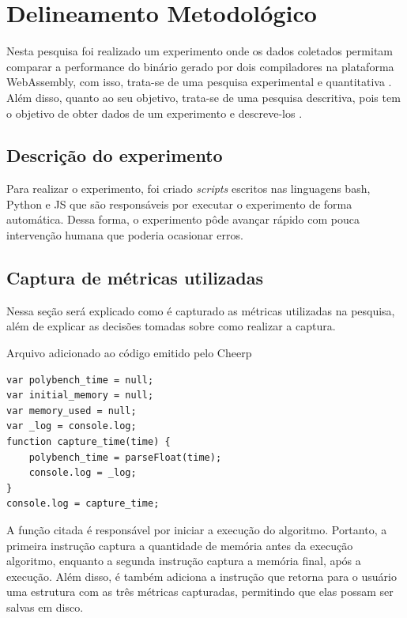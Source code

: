 
\chapter{Delineamento Metodológico}\label{delineamento}

Nesta pesquisa foi realizado um experimento onde os dados coletados permitam comparar a performance do binário gerado por dois compiladores na plataforma WebAssembly, com isso, trata-se de uma pesquisa experimental e quantitativa \cite{metodologia}. Além disso, quanto ao seu objetivo, trata-se de uma pesquisa descritiva, pois tem o objetivo de obter dados de um experimento e descreve-los \cite{gil}.

\section{Descrição do experimento}\label{descricao_experimento}

Para realizar o experimento, foi criado \textit{scripts} escritos nas linguagens bash, Python e JS que são responsáveis por executar o experimento de forma automática. Dessa forma, o experimento pôde avançar rápido com pouca intervenção humana que poderia ocasionar erros.

\section{Captura de métricas utilizadas}\label{manipulacoes}

Nessa seção será explicado como é capturado as métricas utilizadas na pesquisa, além de explicar as decisões tomadas sobre como realizar a captura.

\begin{quadro}
\caption{Arquivo  adicionado ao código emitido pelo Cheerp}
\begin{lstlisting}
var polybench_time = null;
var initial_memory = null;
var memory_used = null;
var _log = console.log;
function capture_time(time) {
    polybench_time = parseFloat(time);
    console.log = _log;
}
console.log = capture_time;
\end{lstlisting}
\label{cheerp_capture_time}
\end{quadro}


A função  citada é responsável por iniciar a execução do algoritmo. Portanto, a primeira instrução captura a quantidade de memória antes da execução algoritmo, enquanto a segunda instrução captura a memória final, após a execução. Além disso, é também adiciona a instrução  que retorna para o usuário uma estrutura com as três métricas capturadas, permitindo que elas possam ser salvas em disco.

